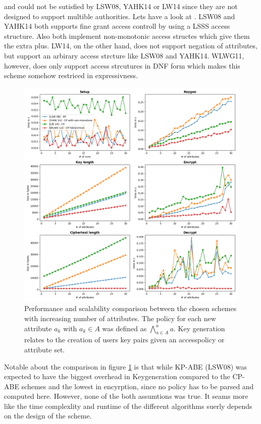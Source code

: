  and  could not be sutisfied by LSW08, YAHK14 or LW14 since they are not designed to support multible authorities. 
Lets have a look at . LSW08 and YAHK14 both supports fine grant access controll by using a LSSS access structure. Also both implement non-monotonic access structes which give them the extra plus. LW14, on the other hand, does not support negation of attributes, but support an arbirary access strcture like LSW08 and YAHK14. WLWG11, however, does only support access strcutures in DNF form which makes this scheme somehow restriced in expressivness. 

\begin{figure}[!ht]
\centering
    \includegraphics[width=1\linewidth]{img/basic_abe_comparisons.png}
    \caption{Performance and scalability comparison between the chosen schemes with increasing number of attributes. The policy for each new attribute $a_k$ with $a_k \in A$ was defined as $\bigwedge\limits_{a \in A}^a a$. Key generation relates to the creation of users key pairs given an accesspolicy or attribute set.}
    \label{fig:basic_abe_comparison}
\end{figure}

Notable about the comparison in figure \ref{fig:basic_abe_comparison} is that while KP-ABE (LSW08) was expected to have the biggest overhead in Keygeneration compared to the CP-ABE schemes and the lowest in encyrption, since no policy has to be parsed and computed here. However, none of the both assumtions was true. It seams more like the time complexlity and runtime of the different algorithms suerly depends on the design of the scheme. 

